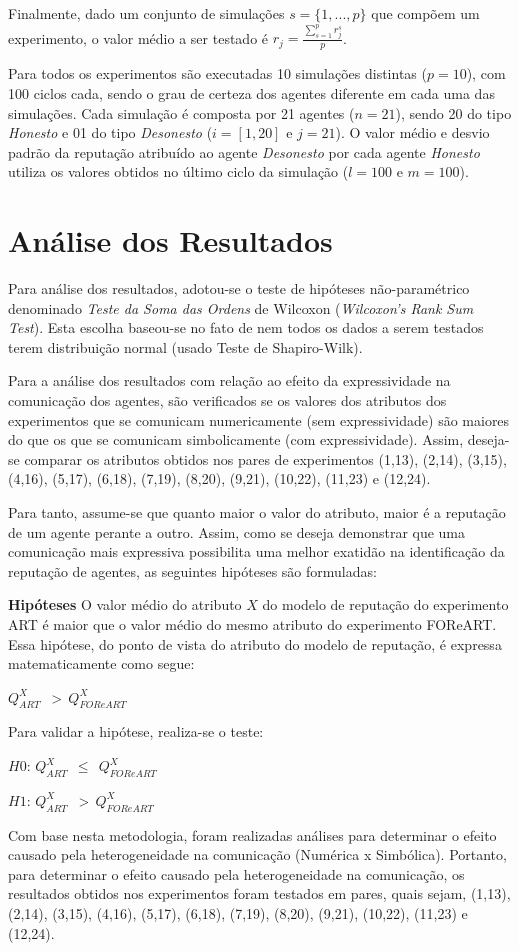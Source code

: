 \documentclass[]{article}
\begin{document}
Finalmente, dado um conjunto de simulações $s = \{1,...,p\}$ que compõem um experimento, o valor médio a ser testado é $r_{j} = \frac{\displaystyle \sum_{s = 1}^{p} r_{j}^{s}}{p}$.

Para todos os experimentos são executadas 10 simulações distintas ($p = 10$), com 100 ciclos cada, sendo o grau de certeza dos agentes diferente em cada uma das simulações. Cada simulação é composta  por 21 agentes ($n = 21$), sendo 20 do tipo {\it Honesto} e 01 do tipo {\it Desonesto} ($i = [1,20]$ e $j = 21$). O valor médio e desvio padrão da reputação atribuído ao agente {\it Desonesto} por cada agente {\it Honesto} utiliza os valores obtidos no último ciclo da simulação ($l = 100$ e $m = 100$).

\section{Análise dos Resultados}
\label{analise}
Para análise dos resultados, adotou-se o teste de hipóteses não-paramétrico denominado {\it Teste da Soma das Ordens} de Wilcoxon ({\it Wilcoxon's Rank Sum Test}). Esta escolha baseou-se no fato de nem todos os dados a serem testados terem distribuição normal (usado Teste de Shapiro-Wilk).

Para a análise dos resultados com relação ao efeito da expressividade na comunicação dos agentes, são verificados se os valores dos atributos dos experimentos que se comunicam numericamente (sem expressividade) são maiores do que os que se comunicam simbolicamente (com expressividade). Assim, deseja-se comparar os atributos obtidos nos pares de experimentos (1,13), (2,14), (3,15), (4,16), (5,17), (6,18), (7,19), (8,20), (9,21), (10,22), (11,23) e (12,24).

Para tanto, assume-se que quanto maior o valor do atributo, maior é a reputação de um agente perante a outro. Assim, como se deseja demonstrar que uma comunicação mais expressiva possibilita uma melhor exatidão na identificação da reputação de agentes, as seguintes hipóteses são formuladas:

\begin{description}
\item {\bf Hipóteses} O valor médio do atributo $X$ do modelo de reputação do experimento ART é maior que o valor médio do mesmo atributo do experimento FOReART. Essa hipótese, do ponto de vista do atributo do modelo de reputação, é expressa matematicamente como segue:

$Q_{ART}^{X}\:\:$ \textgreater $\:\:Q_{FOReART}^{X}$

Para validar a hipótese, realiza-se o teste:

$H0$: $Q_{ART}^{X}\:\: \leq \:\:Q_{FOReART}^{X}$

$H1$: $Q_{ART}^{X}\:\:$ \textgreater $\:\:Q_{FOReART}^{X}$
%
\end{description}
%
Com base nesta metodologia, foram realizadas análises para determinar o efeito causado pela heterogeneidade na comunicação (Numérica x Simbólica). Portanto, para determinar o efeito causado pela heterogeneidade na comunicação, os resultados obtidos nos experimentos foram testados em pares, quais sejam, (1,13), (2,14), (3,15), (4,16), (5,17), (6,18), (7,19), (8,20), (9,21), (10,22), (11,23) e (12,24).
%
\end{document}
